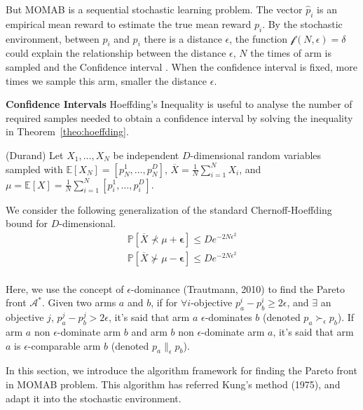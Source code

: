 But MOMAB is a sequential stochastic learning problem. The vector $\hat{p}_i$ is an empirical mean reward to estimate the true mean reward $p_i$. 
By the stochastic environment, between $\hat{p}_i$ and $p_i$ there is a distance $\epsilon$, the function $\mathscr{f}(N,\epsilon) = \delta$ could explain the relationship between the distance $\epsilon$, $N$ the times of arm is sampled and the Confidence interval \cite{Auer02Finite}. 
When the confidence interval is fixed, more times we sample this arm, smaller the distance $\epsilon$.

\textbf{Confidence Intervals}
Hoeffding's Inequality is useful to analyse the number of required samples needed to obtain a confidence interval by solving the inequality in Theorem~\ref{theo:hoeffding}.

\begin{theo} (Durand)
\label{theo:hoeffding}
Let $X_1, \dots, X_N$ be independent $D$-dimensional random variables sampled with $\mathbb{E}[X_N] = [p_N^1,\dots,p_N^D]$, $\overline{X} = \frac{1}{N}\sum_{i=1}^{N}X_i$, and $\mu = \mathbb{E}[X] = \frac{1}{N}\sum_{i=1}^{N}[p_i^1,\dots,p_i^D]$.

We consider the following generalization of the standard Chernoff-Hoeffding bound for $D$-dimensional. 
\begin{equation}
\begin{split}
\mathbb{P}[\overline{X}\nprec \mu + \mathbf{\epsilon}] \leqslant De^{-2N\epsilon^2} \\ 
\mathbb{P}[\overline{X}\nsucc \mu - \mathbf{\epsilon}] \leqslant De^{-2N\epsilon^2} \\ 
\end{split}
\end{equation}
\end{theo}

Here, we use the concept of $\epsilon$-dominance (Trautmann, 2010) to find the Pareto front $\mathscr{A}^{\ast}$. Given two arms $a$ and $b$, if for $\forall i$-objective $p_a^i - p_b^i\geqslant 2\epsilon$, and $\exists$ an objective $j$, $p_a^j - p_b^j > 2\epsilon$, it's said that arm $a$ $\epsilon$-dominates $b$ (denoted $p_a\succ_{\epsilon} p_b$). If arm $a$ non $\epsilon$-dominate arm $b$ and arm $b$ non $\epsilon$-dominate arm $a$, it's said that arm $a$ is $\epsilon$-comparable arm $b$ (denoted $p_a \parallel_{\epsilon} p_b$).

In this section, we introduce the algorithm framework for finding the Pareto front in MOMAB problem. This algorithm has referred Kung's method (1975), and adapt it into the stochastic environment.

